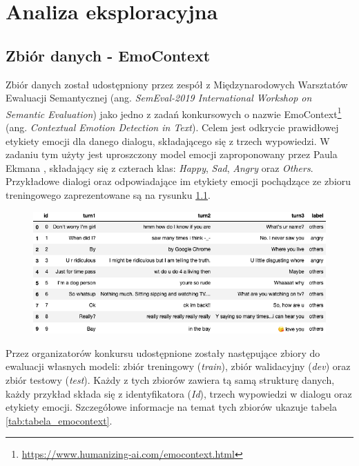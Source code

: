 \chapter{Analiza eksploracyjna}

\section{Zbiór danych - EmoContext}

Zbiór danych został udostępniony przez zespół z Międzynarodowych Warsztatów Ewaluacji Semantycznej (ang. \textit{SemEval-2019 International Workshop on Semantic Evaluation}) jako jedno z zadań konkursowych o nazwie EmoContext\footnote{\url{https://www.humanizing-ai.com/emocontext.html}} (ang. \textit{Contextual Emotion Detection in Text}).  Celem jest odkrycie prawidłowej etykiety emocji dla danego dialogu, składającego się z trzech wypowiedzi. W zadaniu tym użyty jest uproszczony model emocji zaproponowany przez Paula Ekmana \cite{ekman1993facial}, składający się z czterach klas: \textit{Happy}, \textit{Sad}, \textit{Angry} oraz \textit{Others}. Przykładowe dialogi oraz odpowiadające im etykiety emocji pochądzące ze zbioru treningowego zaprezentowane są na rysunku \ref{rys:examples_semeval}.

\begin{figure}[h]
\centering\includegraphics[width=12cm]{figures/examples_semeval.png}
\label{rys:examples_semeval}
\end{figure}

Przez organizatorów konkursu udostępnione zostały następujące zbiory do ewaluacji własnych modeli: zbiór treningowy (\textit{train}), zbiór walidacyjny (\textit{dev}) oraz zbiór testowy (\textit{test}). Każdy z tych zbiorów zawiera tą samą strukturę danych, każdy przykład składa się z identyfikatora (\textit{Id}), trzech wypowiedzi w dialogu oraz etykiety emocji. Szczegółowe informacje na temat tych zbiorów ukazuje tabela \ref{tab:tabela_emocontext}.

